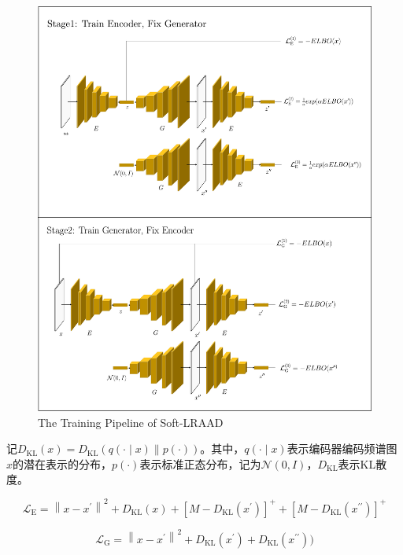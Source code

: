 \documentclass{article}
\begin{document}
\begin{figure}[H]
    \centering
    \includegraphics[width=\textwidth]{./assets/soft_lraad_model.pdf}
    \caption{The Training Pipeline of Soft-LRAAD}
    \label{fig:soft_lraad}
\end{figure}

记$D_{\mathrm{KL}}(x) = D_{\mathrm{KL}}(q(\cdot \mid x) \| p(\cdot))$。其中，$q(\cdot \mid x)$表示编码器编码频谱图$x$的潜在表示的分布，$p(\cdot)$表示标准正态分布，记为$\mathcal{N}(0, I)$，$D_{\mathrm{KL}}$表示KL散度。


\begin{equation}
  \mathcal{L}_{\mathrm{E}}=\left\|x-x^{\prime}\right\|^2 + D_{\mathrm{KL}}(x) + [M - D_{\mathrm{KL}}(x^\prime)]^{+} + [M - D_{\mathrm{KL}}(x^{\prime\prime})]^{+}
\end{equation}

\begin{equation}
  \mathcal{L}_{\text {G}}= \left\|x-x^{\prime}\right\|^2 + D_\mathrm{KL}(x^\prime) + D_\mathrm{KL}(x^{\prime\prime}))
\end{equation}
\end{document}
